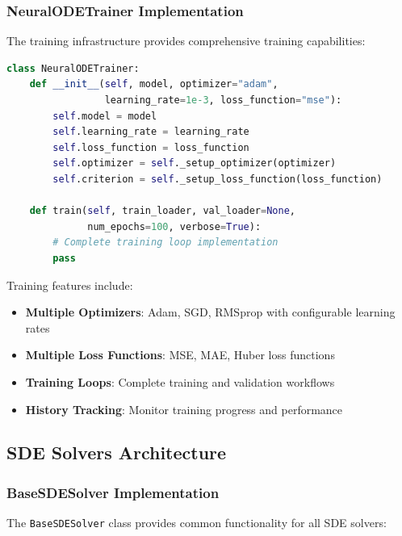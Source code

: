 \subsubsection{NeuralODETrainer Implementation}

The training infrastructure provides comprehensive training capabilities:

\begin{lstlisting}[language=Python, caption=NeuralODETrainer Implementation]
class NeuralODETrainer:
    def __init__(self, model, optimizer="adam", 
                 learning_rate=1e-3, loss_function="mse"):
        self.model = model
        self.learning_rate = learning_rate
        self.loss_function = loss_function
        self.optimizer = self._setup_optimizer(optimizer)
        self.criterion = self._setup_loss_function(loss_function)
    
    def train(self, train_loader, val_loader=None, 
              num_epochs=100, verbose=True):
        # Complete training loop implementation
        pass
\end{lstlisting}

Training features include:
\begin{itemize}
    \item \textbf{Multiple Optimizers}: Adam, SGD, RMSprop with configurable learning rates
    \item \textbf{Multiple Loss Functions}: MSE, MAE, Huber loss functions
    \item \textbf{Training Loops}: Complete training and validation workflows
    \item \textbf{History Tracking}: Monitor training progress and performance
\end{itemize}

\subsection{SDE Solvers Architecture}

\subsubsection{BaseSDESolver Implementation}

The \texttt{BaseSDESolver} class provides common functionality for all SDE solvers:

